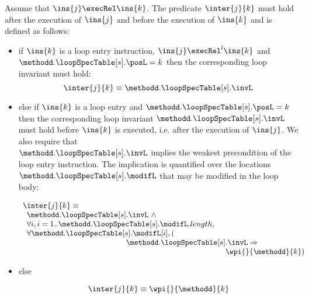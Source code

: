 \begin{defInter}\label{inter} 

Assume that $\ins{j} \execRel \ins{k}$. The predicate $\inter{j}{k}$ must hold after the execution of $\ins{j}$ and before the execution of 
$\ins{k}$ and is defined as follows:
\begin{itemize}
\item if $\ins{k}$ is a loop entry instruction,  $\ins{j} \execRel^l \ins{k}$ and  $ \methodd.\loopSpecTable[s].\posL = k $
then the corresponding loop invariant  must hold:
$$
\inter{j}{k} \equiv  \methodd.\loopSpecTable[s].\invL
$$


\item else if $\ins{k}$  is a loop entry  and  $ \methodd.\loopSpecTable[s].\posL = k $ 
then the corresponding loop invariant $ \methodd.\loopSpecTable[s].\invL$  must hold before $\ins{k}$ is executed, 
i.e. after the execution of $\ins{j}$. We also require that \\
$\methodd.\loopSpecTable[s].\invL$ implies the weakest precondition of the loop entry instruction. 
The implication is quantified over the locations $ \methodd.\loopSpecTable[s].\modifL $ that may be modified in the loop body:

$$\begin{array}{l} \inter{j}{k} \equiv \\ \begin{array}{l}
          \methodd.\loopSpecTable[s].\invL \ \wedge \\
          \forall i , i = 1.. \methodd.\loopSpecTable[s].\modifL.length ,\\
          \forall  \methodd.\loopSpecTable[s].\modifL[i], (\\
	  \phantom{ \methodd.\loopSpecTable[s] }  \methodd.\loopSpecTable[s].\invL \Rightarrow \\
	  \phantom{ \methodd.\loopSpecTable[s]  \methodd.\loopSpecTable[s] } \wpi{ }{ \methodd }{k} ) 
 \end{array}
 \end{array}  $$

\item else 

$$\inter{j}{k} \equiv \wpi{ }{\methodd}{k}$$
\end{itemize}
\end{defInter}
